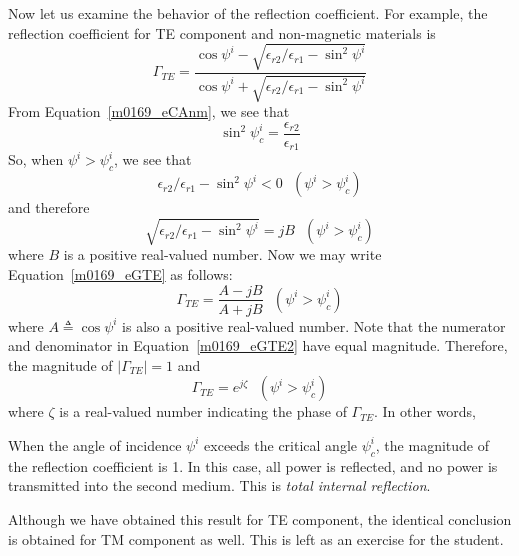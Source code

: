 Now let us examine the behavior of the reflection coefficient.
For example, the reflection coefficient for TE component and non-magnetic materials is 
%
\begin{equation}
\Gamma_{TE} = \frac{ \cos\psi^i - \sqrt{ \epsilon_{r2}/\epsilon_{r1}-\sin^2\psi^i } }
                   { \cos\psi^i + \sqrt{ \epsilon_{r2}/\epsilon_{r1}-\sin^2\psi^i } }
\label{m0169_eGTE}
\end{equation}
%
From Equation~\ref{m0169_eCAnm}, we see that
%
\begin{equation}
\sin^2{\psi^i_c} = \frac{\epsilon_{r2}}{\epsilon_{r1}}
\end{equation}
%
So, when $\psi^i>\psi^i_c$, we see that
%
\begin{equation}
\epsilon_{r2}/\epsilon_{r1}-\sin^2\psi^i < 0 ~~~ (\psi^i>\psi^i_c)
\end{equation}
%
and therefore
%
\begin{equation}
\sqrt{\epsilon_{r2}/\epsilon_{r1}-\sin^2\psi^i} = jB ~~~ (\psi^i>\psi^i_c)
\end{equation}
%
where $B$ is a positive real-valued number.  Now we may write Equation~\ref{m0169_eGTE} as follows:
%
\begin{equation}
\Gamma_{TE} = \frac{A-jB}{A+jB} ~~~ (\psi^i>\psi^i_c)
\label{m0169_eGTE2}
\end{equation}
%
where $A\triangleq\cos\psi^i$ is also a positive real-valued number.
Note that the numerator and denominator in Equation~\ref{m0169_eGTE2} have equal magnitude. 
Therefore, the magnitude of $\left|\Gamma_{TE}\right|=1$ and
%
\begin{equation}
\Gamma_{TE} = e^{j\zeta} ~~~ (\psi^i>\psi^i_c)
\end{equation}
%
where $\zeta$ is a real-valued number indicating the phase of $\Gamma_{TE}$.
In other words, 
%
\begin{mdframed}[backgroundcolor=yellow!20,nobreak=true] 
When the angle of incidence $\psi^i$ exceeds the critical angle $\psi^i_c$, the magnitude of the reflection coefficient is 1.
In this case, all power is reflected, and no power is transmitted into the second medium.
This is \emph{total internal reflection}.  
\end{mdframed}
%
Although we have obtained this result for TE component, the identical conclusion is obtained for TM component as well.
This is left as an exercise for the student.

